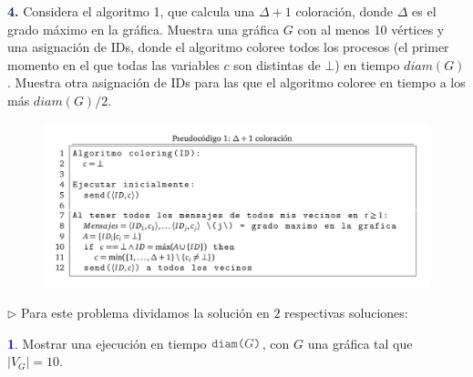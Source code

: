 \newpage
\textbf{\textcolor{MidnightBlue}{4.}} Considera el algoritmo 1,
que calcula una $\Delta + 1$ coloración, donde $\Delta$ es el
grado máximo en la gráfica. Muestra una gráfica $G$ con al menos
10 vértices y una asignación de IDs, donde el algoritmo coloree
todos los procesos (el primer momento en el que todas las variables
$c$ son distintas de $\bot$) en tiempo $diam(G)$. Muestra otra
asignación de IDs para las que el algoritmo coloree en tiempo a los
más $diam(G)/2$.

\begin{figure}[ht]
        \begin{center}
                \includegraphics[width=15cm]{AlgoritmoP5.png}
        \end{center}
\end{figure}

$\rhd$ Para este problema dividamos la solución en $2$ respectivas
soluciones:                                                             \newline

\hspace*{0.5cm} \textbf{\textcolor{blue}{1}}. Mostrar una ejecución
en tiempo $\code{diam($G$)}$, con $G$ una gráfica tal que $|V_G| = 10$.

